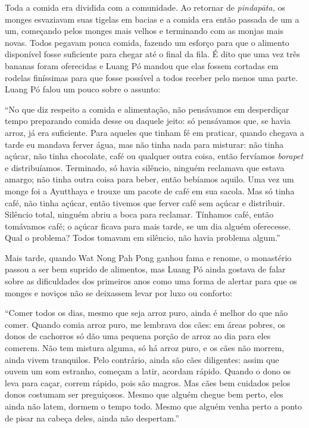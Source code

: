 Toda a comida era dividida com a comunidade. Ao retornar de
\emph{pindapāta,} os monges esvaziavam suas tigelas em bacias e a comida
era então passada de um a um, começando pelos monges mais velhos e
terminando com as monjas mais novas. Todos pegavam pouca comida, fazendo
um esforço para que o alimento disponível fosse suficiente para chegar
até o final da fila. É dito que uma vez três bananas foram oferecidas e
Luang Pó mandou que elas fossem cortadas em rodelas finíssimas para que
fosse possível a todos receber pelo menos uma parte. Luang Pó falou um
pouco sobre o assunto:

``No que diz respeito a comida e alimentação, não pensávamos em
desperdiçar tempo preparando comida desse ou daquele jeito: só
pensávamos que, se havia arroz, já era suficiente. Para aqueles que
tinham fé em praticar, quando chegava a tarde eu mandava ferver água,
mas não tinha nada para misturar: não tinha açúcar, não tinha chocolate,
café ou qualquer outra coisa, então fervíamos \emph{borapet} e
distribuíamos. Terminado, só havia silêncio, ninguém reclamava que
estava amargo; não tinha outra coisa para beber, então bebíamos aquilo.
Uma vez um monge foi a Ayutthaya e trouxe um pacote de café em sua
sacola. Mas só tinha café, não tinha açúcar, então tivemos que ferver
café sem açúcar e distribuir. Silêncio total, ninguém abriu a boca para
reclamar. Tínhamos café, então tomávamos café; o açúcar ficava para mais
tarde, se um dia alguém oferecesse. Qual o problema? Todos tomavam em
silêncio, não havia problema algum.''

Mais tarde, quando Wat Nong Pah Pong ganhou fama e renome, o monastério
passou a ser bem suprido de alimentos, mas Luang Pó ainda gostava de
falar sobre as dificuldades dos primeiros anos como uma forma de alertar
para que os monges e noviços não se deixassem levar por luxo ou
conforto:

``Comer todos os dias, mesmo que seja arroz puro, ainda é melhor do que
não comer. Quando comia arroz puro, me lembrava dos cães: em áreas
pobres, os donos de cachorros só dão uma pequena porção de arroz ao dia
para eles comerem. Não tem mistura alguma, só há arroz puro, e os cães
não morrem, ainda vivem tranquilos. Pelo contrário, ainda são cães
diligentes: assim que ouvem um som estranho, começam a latir, acordam
rápido. Quando o dono os leva para caçar, correm rápido, pois são
magros. Mas cães bem cuidados pelos donos costumam ser preguiçosos.
Mesmo que alguém chegue bem perto, eles ainda não latem, dormem o tempo
todo. Mesmo que alguém venha perto a ponto de pisar na cabeça deles,
ainda não despertam.''

